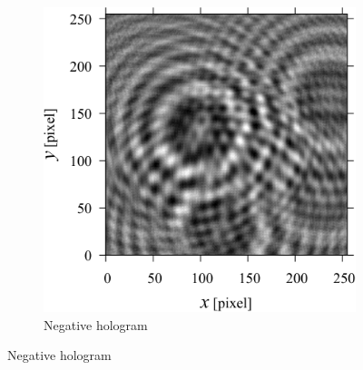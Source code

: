 \begin{figure}[H]
\begin{subfigure}[t]{0.45\linewidth}
        \includegraphics[width=\linewidth]{./Figure/3_Methods/far1.pdf}
        \caption{Negative hologram}
        \label{fig:trainingData:negaholo}
    \end{subfigure}


\end{figure}
